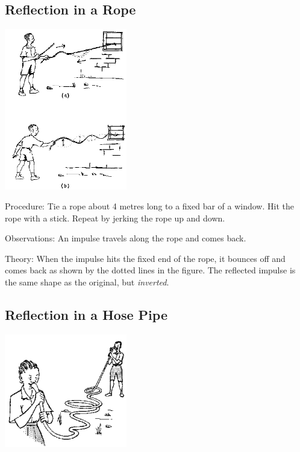 \begin{multicols}{2}
\subsection{Reflection in a Rope}

\begin{center}
\includegraphics[width=0.4\textwidth]{./img/source/reflection-rope-waves.png}
\end{center}

\begin{description*}
\item[Procedure:]{Tie a rope about 4 metres long to a fixed bar of a window. Hit the rope with a stick. Repeat by jerking the rope up and down.}
\item[Observations:]{An impulse travels along the rope and comes back.}
\item[Theory:]{When the impulse hits the fixed end of the rope, it bounces off and comes back as shown by the dotted lines in the figure. The reflected impulse is the same shape as the original, but \emph{inverted}.}
\end{description*}

\subsection{Reflection in a Hose Pipe}

\begin{center}
\includegraphics[width=0.4\textwidth]{./img/source/reflection-hose-waves.png}
\end{center}


\end{multicols}
